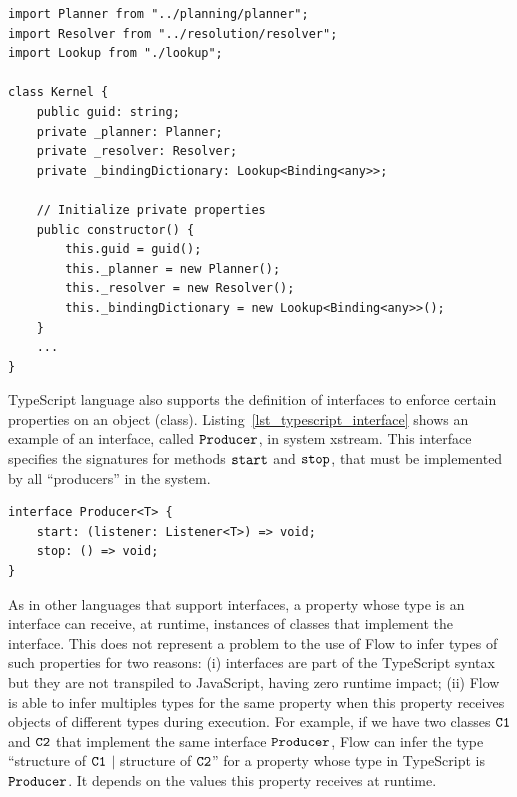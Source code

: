 \documentclass[review]{elsarticle}
\newcommand{\aspas}[1]{{``#1''}}
\newcommand{\mcode}[1]{$\tt #1$}
\begin{document}
\begin{lstlisting}[caption=Example of class associations in TypeScript, label=lst_typescript_kernel, basicstyle=\ttfamily\footnotesize, emph={[2]},emphstyle={[2]\ttfamily\bfseries\color{darkgreen}}]
import Planner from "../planning/planner";
import Resolver from "../resolution/resolver";
import Lookup from "./lookup";

class Kernel {
	public guid: string;
	private _planner: Planner;
	private _resolver: Resolver;
	private _bindingDictionary: Lookup<Binding<any>>;

	// Initialize private properties
	public constructor() {
		this.guid = guid();
		this._planner = new Planner();
		this._resolver = new Resolver();
		this._bindingDictionary = new Lookup<Binding<any>>();
	}
	...
}
\end{lstlisting} 

TypeScript language also supports the definition of interfaces to enforce certain properties on an object (class).
Listing~\ref{lst_typescript_interface} shows an example of an interface, called \mcode{Producer}, in system {\sc xstream}. This interface specifies the signatures for methods \mcode{start} and \mcode{stop}, that must be implemented by all \aspas{producers} in the system. 

\begin{lstlisting}[caption=Example of interface in TypeScript, label=lst_typescript_interface, basicstyle=\ttfamily\footnotesize, emph={[2]string,boolean},emphstyle={[2]\ttfamily\bfseries\color{darkgreen}}]
interface Producer<T> {
	start: (listener: Listener<T>) => void;
	stop: () => void;
}
\end{lstlisting} 

As in other languages that support interfaces, a property whose type is an interface can receive, at runtime, instances of classes that implement the interface. This does not represent a problem to the use of Flow to infer types of such properties for two reasons: (i) interfaces are part of the TypeScript syntax but they are not transpiled to JavaScript, having zero runtime impact; (ii) Flow is able to infer multiples types for the same property when this property receives objects of different types during execution. For example, if we have two classes \mcode{C1} and \mcode{C2} that implement the same interface \mcode{Producer}, Flow can infer the type \aspas{structure of \mcode{C1} $|$ structure of \mcode{C2}} for a property whose type in TypeScript is \mcode{Producer}. It depends on the values this property receives at runtime.
\end{document}
